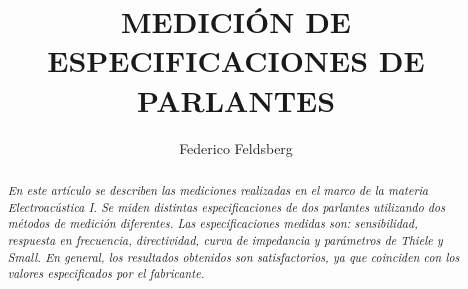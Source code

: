 \documentclass[]{article}
\title{\textbf{\LARGE{\textsf{MEDICIÓN DE ESPECIFICACIONES DE PARLANTES}}}}
\date{} %
\begin{document}
\renewcommand{\headrulewidth}{0pt} %


\author[1]{Federico Feldsberg} %


\begin{minipage}[h]{\textwidth} %
    \maketitle
    \thispagestyle{fancy}
    \fancyhf{}
    \rhead{\today}
    \cfoot{\thepage}

\end{minipage}


\begin{abstract}

\textit{En este artículo se describen las mediciones realizadas en el marco de
la materia Electroacústica I. Se miden distintas especificaciones de dos
parlantes utilizando dos métodos de medición diferentes. Las especificaciones medidas son:
sensibilidad, respuesta en frecuencia, directividad, curva de impedancia y parámetros de
Thiele y Small. En general, los resultados obtenidos son satisfactorios, ya que
coinciden con los valores especificados por el fabricante.}

\end{abstract}

\vspace{0.5cm}%
\end{document}
